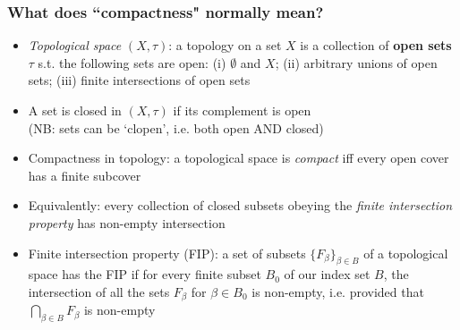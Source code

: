 \begin{frame}
\frametitle{What does ``compactness" normally mean?}

\begin{itemize}[<+->]

\item \emph{Topological space} $(X, \tau)$: a topology on a set $X$ is a collection of \textbf{open sets} $\tau$ s.t. the following sets are open: (i) $\emptyset$ and $X$; (ii) arbitrary unions of open sets; (iii) finite intersections of open sets


\item A set is closed in $(X, \tau)$ if its complement is open \\ (NB: sets can be `clopen', i.e. both open AND closed)

\medskip

\item Compactness in topology: a topological space is \emph{compact} iff every open cover has a finite subcover

\item Equivalently: every collection of closed subsets obeying the \textit{finite intersection property} has non-empty intersection

\medskip

\item Finite intersection property (FIP): a set of subsets $\{ F_{\beta} \}_{\beta \in B}$ of a topological space has the FIP if for every finite subset $B_0$ of our index set $B$, the intersection of all the sets $F_{\beta}$ for $\beta \in B_0$ is non-empty, i.e. provided that $\bigcap_{\beta \in B} F_{\beta}$ is non-empty 



\end{itemize}
\end{frame}

